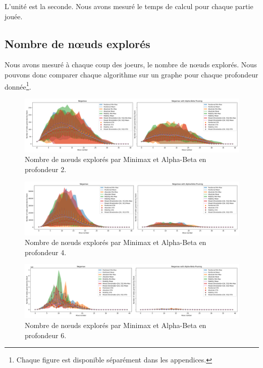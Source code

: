 L'unité est la seconde. Nous avons mesuré le temps de calcul pour chaque partie jouée.


\subsection{Nombre de nœuds explorés}
\label{subsec:node_explored}
Nous avons mesuré à chaque coup des joeurs, le nombre de nœuds explorés. Nous pouvons donc comparer chaque algorithme sur un graphe pour chaque profondeur donnée\footnote{Chaque figure est disponible séparément dans les appendices.}.

\begin{figure}[H]
    \centering
    \includegraphics[width=\textwidth]{ressources/Number of nodes generated by Black_depth_2_combined.png}
    \caption{Nombre de nœuds explorés par Minimax et Alpha-Beta en profondeur 2.}
    \label{fig:complexity_node_explored-2}
\end{figure}

\begin{figure}[H]
    \centering
    \includegraphics[width=\textwidth]{ressources/Number of nodes generated by Black_depth_4_combined.png}
    \caption{Nombre de nœuds explorés par Minimax et Alpha-Beta en profondeur 4.}
    \label{fig:complexity_node_explored-4}
\end{figure}

\begin{figure}[H]
    \centering
    \includegraphics[width=\textwidth]{ressources/Number of nodes generated by Black_depth_6_combined.png}
    \caption{Nombre de nœuds explorés par Minimax et Alpha-Beta en profondeur 6.}
    \label{fig:complexity_node_explored-6}
\end{figure}

